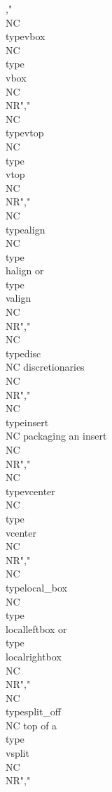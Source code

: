 ,"\\NC \\type{vbox}          \\NC \\type {\\vbox}                                   \\NC \\NR","\\NC \\type{vtop}          \\NC \\type {\\vtop}                                   \\NC \\NR","\\NC \\type{align}         \\NC \\type {\\halign} or \\type {\\valign}              \\NC \\NR","\\NC \\type{disc}          \\NC discretionaries                                 \\NC \\NR","\\NC \\type{insert}        \\NC packaging an insert                             \\NC \\NR","\\NC \\type{vcenter}       \\NC \\type {\\vcenter}                                \\NC \\NR","\\NC \\type{local_box}     \\NC \\type {\\localleftbox} or \\type {\\localrightbox} \\NC \\NR","\\NC \\type{split_off}     \\NC top of a \\type {\\vsplit}                        \\NC \\NR","\\